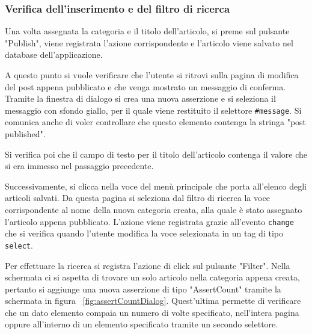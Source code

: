 \documentclass[12pt]{toptesi}
\begin{document}


\subsubsection{Verifica dell'inserimento e del filtro di ricerca}

Una volta assegnata la categoria e il titolo dell'articolo, si preme sul pulsante "Publish", viene registrata l'azione corrispondente e l'articolo viene salvato nel database dell'applicazione. 

A questo punto si vuole verificare che l'utente si ritrovi sulla pagina di modifica del post appena pubblicato e che venga mostrato un messaggio di conferma. Tramite la finestra di dialogo si crea una nuova asserzione e si seleziona il messaggio con sfondo giallo, per il quale viene restituito il selettore \verb|#message|. Si comunica anche di voler controllare che questo elemento contenga la stringa "post published".

Si verifica poi che il campo di testo per il titolo dell'articolo contenga il valore che si era immesso nel passaggio precedente.

Successivamente, si clicca nella voce del menù principale che porta all'elenco degli articoli salvati. Da questa pagina si seleziona dal filtro di ricerca la voce corrispondente al nome della nuova categoria creata, alla quale è stato assegnato l'articolo appena pubblicato. L'azione viene registrata grazie all'evento \verb|change| che si verifica quando l'utente modifica la voce selezionata in un tag di tipo \verb|select|. 

Per effettuare la ricerca si registra l'azione di click sul pulsante "Filter". Nella schermata ci si aspetta di trovare un solo articolo nella categoria appena creata, pertanto si aggiunge una nuova asserzione di tipo "AssertCount" tramite la schermata in figura ~\ref{fig:assertCountDialog}. Quest'ultima permette di verificare che un dato elemento compaia un numero di volte specificato, nell'intera pagina oppure all'interno di un elemento specificato tramite un secondo selettore.
\end{document}
